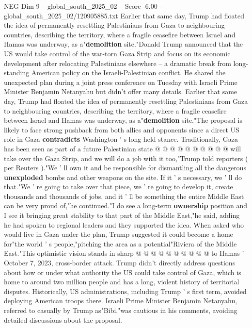 \begin{textsample}{NEG Dim 9 – global\_south\_2025\_02 – Score -6.00 – global\_south\_2025\_02/120905885.txt}  \label{ex:f9_neg_056}
Earlier that same day, Trump had floated the idea of permanently resettling Palestinians from Gaza to neighbouring countries, describing the territory, where a fragile ceasefire between Israel and Hamas was underway, as a"\textbf{demolition} site."Donald Trump announced that the US would take control of the war-torn Gaza Strip and focus on its economic development after relocating Palestinians elsewhere -- a dramatic break from long-standing American policy on the Israeli-Palestinian conflict.
He shared the unexpected plan during a joint press conference on Tuesday with Israeli Prime Minister Benjamin Netanyahu but didn't offer many details.
Earlier that same day, Trump had floated the idea of permanently resettling Palestinians from Gaza to neighbouring countries, describing the territory, where a fragile ceasefire between Israel and Hamas was underway, as a"\textbf{demolition} site."The proposal is likely to face strong pushback from both allies and opponents since a direct US role in Gaza \textbf{contradicts} Washington ' s long-held stance.
Traditionally, Gaza has been seen as part of a future Palestinian state @ @ @ @ @ @ @ @ @ @ will take over the Gaza Strip, and we will do a job with it too,"Trump told reporters ( per Reuters )."We ' ll own it and be responsible for dismantling all the dangerous \textbf{unexploded} bombs and other weapons on the site.
If it ' s necessary, we ' ll do that."We ' re going to take over that piece, we ' re going to develop it, create thousands and thousands of jobs, and it ' ll be something the entire Middle East can be very proud of,"he continued."I do see a long-term \textbf{ownership} position and I see it bringing great stability to that part of the Middle East,"he said, adding he had spoken to regional leaders and they supported the idea.
When asked who would live in Gaza under the plan, Trump suggested it could become a home for"the world ' s people,"pitching the area as a potential"Riviera of the Middle East."This optimistic vision stands in sharp @ @ @ @ @ @ @ @ @ @ to Hamas ' October 7, 2023, cross-border attack.
Trump didn't directly address questions about how or under what authority the US could take control of Gaza, which is home to around two million people and has a long, violent history of territorial disputes.
Historically, US administrations, including Trump ' s first term, avoided deploying American troops there.
Israeli Prime Minister Benjamin Netanyahu, referred to casually by Trump as"Bibi,"was cautious in his comments, avoiding detailed discussions about the proposal.

\end{textsample}
